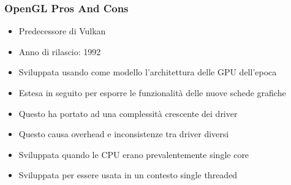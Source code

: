 \begin{frame}
\frametitle{OpenGL Pros And Cons}

\begin{itemize}
\item Predecessore di Vulkan
\item Anno di rilascio: 1992
\item Sviluppata usando come modello l'architettura delle GPU dell'epoca
\item Estesa in seguito per esporre le funzionalità delle nuove schede grafiche
\item Questo ha portato ad una complessità crescente dei driver
\item Questo causa overhead e inconsistenze tra driver diversi
\item Sviluppata quando le CPU erano prevalentemente single core
\item Sviluppata per essere usata in un contesto single threaded
\end{itemize}

\end{frame}
